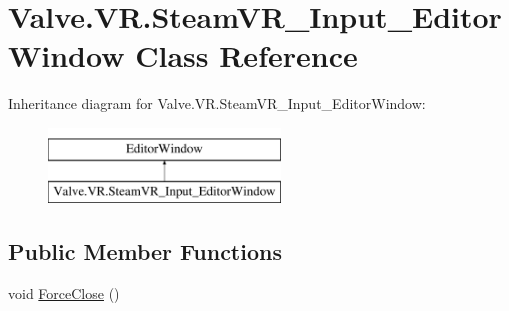 \hypertarget{class_valve_1_1_v_r_1_1_steam_v_r___input___editor_window}{}\section{Valve.\+V\+R.\+Steam\+V\+R\+\_\+\+Input\+\_\+\+Editor\+Window Class Reference}
\label{class_valve_1_1_v_r_1_1_steam_v_r___input___editor_window}
Inheritance diagram for Valve.\+V\+R.\+Steam\+V\+R\+\_\+\+Input\+\_\+\+Editor\+Window\+:\begin{figure}[H]
\begin{center}
\leavevmode
\includegraphics[height=2.000000cm]{class_valve_1_1_v_r_1_1_steam_v_r___input___editor_window}
\end{center}
\end{figure}
\subsection*{Public Member Functions}
\begin{DoxyCompactItemize}
\item 
void \mbox{\hyperlink{class_valve_1_1_v_r_1_1_steam_v_r___input___editor_window_a4bf70d50040dc00586252c9ccb53a98e}{Force\+Close}} ()
\end{DoxyCompactItemize}
